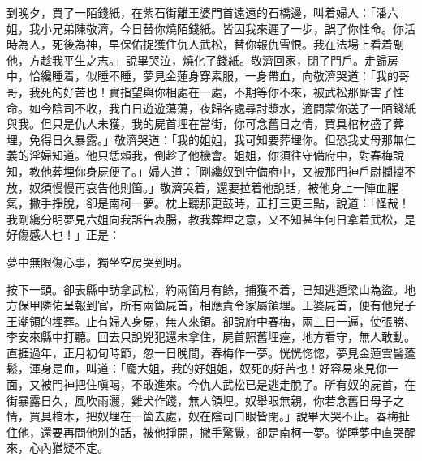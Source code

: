 到晚夕，買了一陌錢紙，在紫石街離王婆門首遠遠的石橋邊，叫着婦人：「潘六姐，我小兄弟陳敬濟，今日替你燒陌錢紙。皆因我來遲了一步，誤了你性命。你活時為人，死後為神，早保佑捉獲住仇人武松，替你報仇雪恨。我在法場上看着剮他，方趁我平生之志。」說畢哭泣，燒化了錢紙。敬濟回家，閉了門戶。走歸房中，恰纔睡着，似睡不睡，夢見金蓮身穿素服，一身帶血，向敬濟哭道：「我的哥哥，我死的好苦也！實指望與你相處在一處，不期等你不來，被武松那厮害了性命。如今陰司不收，我白日遊遊蕩蕩，夜歸各處尋討漿水，適間蒙你送了一陌錢紙與我。但只是仇人未獲，我的屍首埋在當街，你可念舊日之情，買具棺材盛了葬埋，免得日久暴露。」敬濟哭道：「我的姐姐，我可知要葬埋你。但恐我丈母那無仁義的淫婦知道。他只恁賴我，倒趁了他機會。姐姐，你須往守備府中，對春梅說知，教他葬埋你身屍便了。」婦人道：「剛纔奴到守備府中，又被那門神戶尉攔擋不放，奴須慢慢再哀告他則箇。」敬濟哭着，還要拉着他說話，被他身上一陣血腥氣，撇手掙脫，卻是南柯一夢。枕上聽那更鼓時，正打三更三點，說道：「怪哉！我剛纔分明夢見六姐向我訴告衷腸，教我葬埋之意，又不知甚年何日拿着武松，是好傷感人也！」正是：

\begin{myquote}
夢中無限傷心事，獨坐空房哭到明。
\end{myquote}

按下一頭。卻表縣中訪拿武松，約兩箇月有餘，捕獲不着，已知逃遁梁山為盜。地方保甲隣佑呈報到官，所有兩箇屍首，相應責令家屬領埋。王婆屍首，便有他兒子王潮領的埋葬。止有婦人身屍，無人來領。卻說府中春梅，兩三日一遍，使張勝、李安來縣中打聽。回去只說兇犯還未拿住，屍首照舊埋瘞，地方看守，無人敢動。直捱過年，正月初旬時節，忽一日晚間，春梅作一夢。恍恍惚惚，夢見金蓮雲髻蓬鬆，渾身是血，叫道：「龐大姐，我的好姐姐，奴死的好苦也！好容易來見你一面，又被門神把住嗔喝，不敢進來。今仇人武松已是逃走脫了。所有奴的屍首，在街暴露日久，風吹雨灑，雞犬作踐，無人領埋。奴舉眼無親，你若念舊日母子之情，買具棺木，把奴埋在一箇去處，奴在陰司口眼皆閉。」{}說畢大哭不止。春梅扯住他，還要再問他別的話，被他掙開，撇手驚覺，卻是南柯一夢。從睡夢中直哭醒來，心內猶疑不定。

